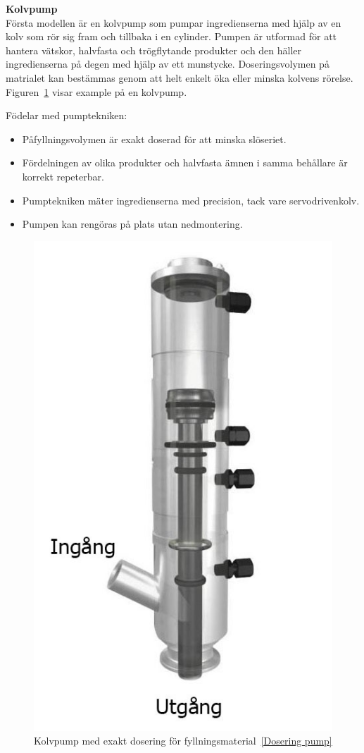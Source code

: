 \textbf{Kolvpump}\\
Första modellen är en kolvpump som pumpar ingredienserna med hjälp av en kolv som rör sig fram och tillbaka i en cylinder. Pumpen är utformad för att hantera vätskor, halvfasta och trögflytande produkter och den häller ingredienserna på degen med hjälp av ett munstycke. Doseringsvolymen på matrialet kan bestämmas genom att helt enkelt öka eller minska kolvens rörelse. Figuren~\ref{kolvpump} visar example på en kolvpump.

Födelar med pumptekniken:
\begin{itemize}
	\item Påfyllningsvolymen är exakt doserad för att minska slöseriet.
	\item Fördelningen av olika produkter och halvfasta ämnen i samma behållare är korrekt repeterbar.
	\item Pumptekniken mäter ingredienserna med precision, tack vare servodrivenkolv.
	\item Pumpen kan rengöras på plats utan nedmontering.
\end{itemize}

\begin{figure}[h]
	\begin{center}
		\includegraphics[scale=0.5]{images/maxresdefault.jpg}
		\caption{Kolvpump med exakt dosering för fyllningsmaterial~\ref{Dosering pump}}
		\label{kolvpump}	
	\end{center}
\end{figure}

